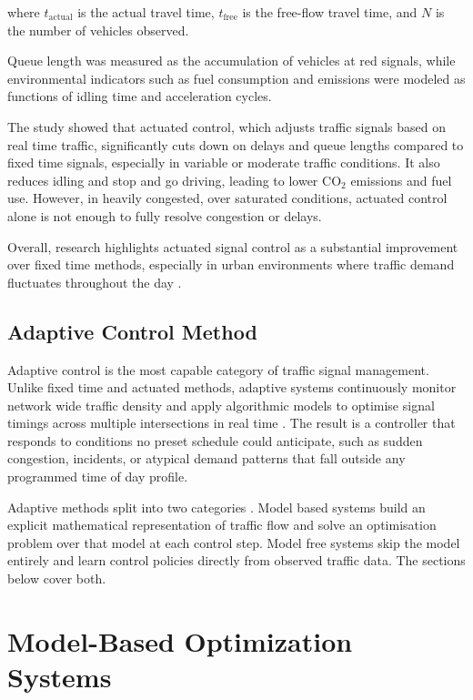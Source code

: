 ﻿\documentclass[11pt, a4paper]{report}
\begin{document}
where $t_{\text{actual}}$ is the actual travel time, $t_{\text{free}}$ is the free-flow travel time, and $N$ is the number of vehicles observed.

Queue length was measured as the accumulation of vehicles at red signals, while environmental indicators such as fuel consumption and emissions were modeled as functions of idling time and acceleration cycles.

The study showed that actuated control, which adjusts traffic signals based on real time traffic, significantly cuts down on delays and queue lengths compared to fixed time signals, especially in variable or moderate traffic conditions. It also reduces idling and stop and go driving, leading to lower CO$_2$ emissions and fuel use. However, in heavily congested, over saturated conditions, actuated control alone is not enough to fully resolve congestion or delays.

Overall, research highlights actuated signal control as a substantial improvement over fixed time methods, especially in urban environments where traffic demand fluctuates throughout the day \cite{kalavsova2022impact}.

\subsection{Adaptive Control Method}

Adaptive control is the most capable category of traffic signal management. Unlike fixed time and actuated methods, adaptive systems continuously monitor network wide traffic density and apply algorithmic models to optimise signal timings across multiple intersections in real time \cite{mannion2016experimental}. The result is a controller that responds to conditions no preset schedule could anticipate, such as sudden congestion, incidents, or atypical demand patterns that fall outside any programmed time of day profile.

Adaptive methods split into two categories \cite{ye2019survey}. Model based systems build an explicit mathematical representation of traffic flow and solve an optimisation problem over that model at each control step. Model free systems skip the model entirely and learn control policies directly from observed traffic data. The sections below cover both.

\section{Model-Based Optimization Systems}
\end{document}
